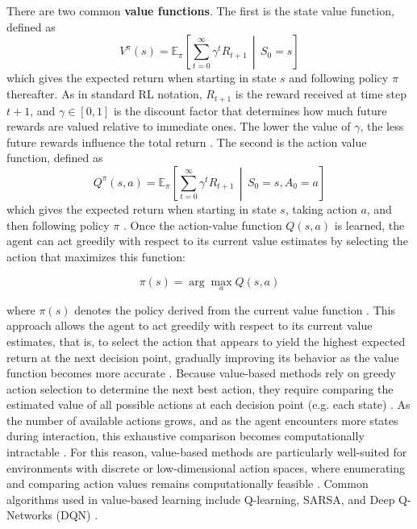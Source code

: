 \documentclass[final]{anthology-ch}         %
\begin{document}
There are two common \textbf{value functions}. The first is the state value function, defined as
    \begin{equation}
        V^{\pi}(s) = \mathbb{E}_{\pi} \left[ \sum_{t=0}^{\infty} \gamma^t R_{t+1} \,\middle|\, S_0 = s \right]
        \label{eq:v_function}
    \end{equation}
    which gives the expected return when starting in state $s$ and following policy $\pi$ thereafter. As in standard RL notation, \( R_{t+1} \) is the reward received at time step \( t+1 \), and \( \gamma \in [0, 1] \) is the discount factor that determines how much future rewards are valued relative to immediate ones. The lower the value of $\gamma$, the less future rewards influence the total return \cite{Sutton1998, russell2016artificial}. The second is the action value function, defined as
    \begin{equation}
        Q^{\pi}(s, a) = \mathbb{E}_{\pi} \left[ \sum_{t=0}^{\infty} \gamma^t R_{t+1} \,\middle|\, S_0 = s, A_0 = a \right]
        \label{eq:q_function}
    \end{equation}
which gives the expected return when starting in state $s$, taking action $a$, and then following policy $\pi$ \cite{Sutton1998, russell2016artificial}. Once the action-value function \( Q(s, a) \) is learned,  the agent can act greedily with respect to its current value estimates by selecting the action that maximizes this function:

\begin{equation}
    \pi(s) = \arg\max_a Q(s, a)
    \label{eq:greedy_policy}
\end{equation}

where \( \pi(s) \) denotes the policy derived from the current value function \cite{Sutton1998}. This approach allows the agent to act greedily with respect to its current value estimates, that is, to select the action that appears to yield the highest expected return at the next decision point, gradually improving its behavior as the value function becomes more accurate \cite{Sutton1998}. Because value-based methods rely on greedy action selection to determine the next best action, they require comparing the estimated value of all possible actions at each decision point (e.g. each state) \cite{Sutton1998, dulac2019challenges}. As the number of available actions grows, and as the agent encounters more states during interaction, this exhaustive comparison becomes computationally intractable \cite{dulac2019challenges}. For this reason, value-based methods are particularly well-suited for environments with discrete or low-dimensional action spaces, where enumerating and comparing action values remains computationally feasible \cite{dulac2019challenges, Sutton1998}. Common algorithms used in value-based learning include Q-learning, SARSA, and Deep Q-Networks (DQN) \cite{Sutton1998, mnih2015human}. 
\end{document}
